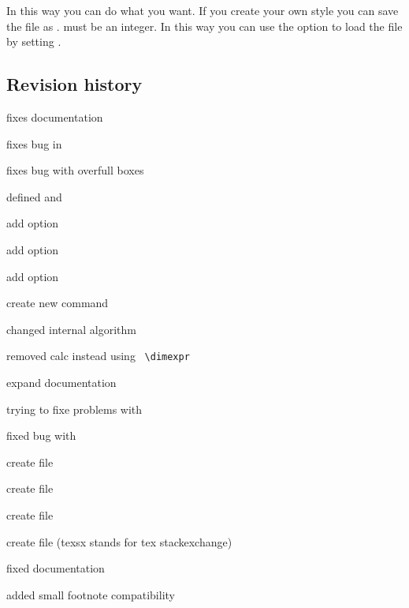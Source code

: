 \documentclass[parskip=false,english,11pt]{ltxmdf}
\begin{document}
In this way you can do what you want. If you create your own style you
can save the file as .
 must be an integer. 
In this way you can use the option  to
load the file by setting .

\clearpage



\subsection{Revision history}\label{rev}
\raggedright
{}
\begin{itemize*}
\item fixes documentation
\item fixes bug in 
\item fixes bug with overfull boxes
\item defined  and  \limitation[PSTricks]
\end{itemize*}


\begin{itemize*}
\item add option 
\item add option 
\item add option 
\item create new command 
\item changed internal algorithm
\item removed calc instead using \eTeX\ \verb+\dimexpr+
\item expand documentation
\item trying to fixe problems with 
\item fixed bug with 
\item create file 
\item create file 
\item create file 
\item create file  (texsx stands for tex stackexchange)
\end{itemize*}


\footnotesize
{}
\begin{itemize*}
\item fixed documentation
\item added small footnote compatibility
\end{itemize*}
\end{document}
